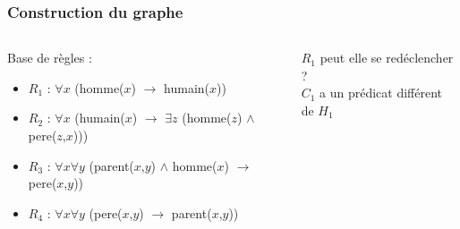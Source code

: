 \begin{frame}
	\frametitle{Construction du graphe}
	\begin{columns}
	\begin{column}{0.55\linewidth}
		Base de règles :
		\begin{itemize}
			\item $R_1$ : $\forall x$ (homme($x$) $\rightarrow$ humain($x$))
			\item $R_2$ : $\forall x$ (humain($x$) $\rightarrow$ $\exists z$ (homme($z$)
			$\wedge$ pere($z$,$x$)))
			\item $R_3$ : $\forall x \forall y$ (parent($x$,$y$) $\wedge$ homme($x$)
			$\rightarrow$ pere($x$,$y$))
			\item $R_4$ : $\forall x \forall y$ (pere($x$,$y$) $\rightarrow$
			parent($x$,$y$))
		\end{itemize}
	\end{column}
	\vline
	\hfill
	\begin{column}{0.35\linewidth}
		\begin{center}
			$R_1$ peut elle se redéclencher ?\\
			$C_1$ a un prédicat différent de $H_1$
		\end{center}
		\begin{figure}
		\end{figure}
	\end{column}
	\end{columns}
\end{frame}


